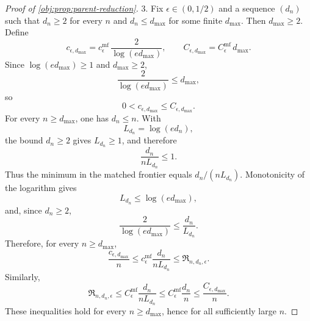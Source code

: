 \begin{proof}[Proof of \cref{obj:prop:parent-reduction}]
3. Fix \(\epsilon\in(0,1/2)\) and a sequence \((d_n)\) such that \(d_n\ge2\) for every \(n\) and
\(d_n\le d_{\max}\) for some finite \(d_{\max}\). Then \(d_{\max}\ge2\). Define
\[
c_{\epsilon,d_{\max}}
=
c_\epsilon^{\mathrm{mf}}\,\frac{2}{\log(ed_{\max})},
\qquad
C_{\epsilon,d_{\max}}
=
C_\epsilon^{\mathrm{mf}}\,d_{\max}.
\]
Since \(\log(ed_{\max})\ge1\) and \(d_{\max}\ge2\),
\[
\frac{2}{\log(ed_{\max})}\le d_{\max},
\]
so
\[
0<c_{\epsilon,d_{\max}}\le C_{\epsilon,d_{\max}}.
\]
For every \(n\ge d_{\max}\), one has \(d_n\le n\). With
\[
L_{d_n}=\log(ed_n),
\]
the bound \(d_n\ge2\) gives \(L_{d_n}\ge1\), and therefore
\[
\frac{d_n}{nL_{d_n}}\le1.
\]
Thus the minimum in the matched frontier equals \(d_n/(nL_{d_n})\). Monotonicity of the logarithm gives
\[
L_{d_n}\le \log(ed_{\max}),
\]
and, since \(d_n\ge2\),
\[
\frac{2}{\log(ed_{\max})}
\le
\frac{d_n}{L_{d_n}}.
\]
Therefore, for every \(n\ge d_{\max}\),
\[
\frac{c_{\epsilon,d_{\max}}}{n}
\le
c_\epsilon^{\mathrm{mf}}\frac{d_n}{nL_{d_n}}
\le
\mathfrak R_{n,d_n,\epsilon}.
\]
Similarly,
\[
\mathfrak R_{n,d_n,\epsilon}
\le
C_\epsilon^{\mathrm{mf}}\frac{d_n}{nL_{d_n}}
\le
C_\epsilon^{\mathrm{mf}}\frac{d_n}{n}
\le
\frac{C_{\epsilon,d_{\max}}}{n}.
\]
These inequalities hold for every \(n\ge d_{\max}\), hence for all sufficiently large \(n\). %
\end{proof}
